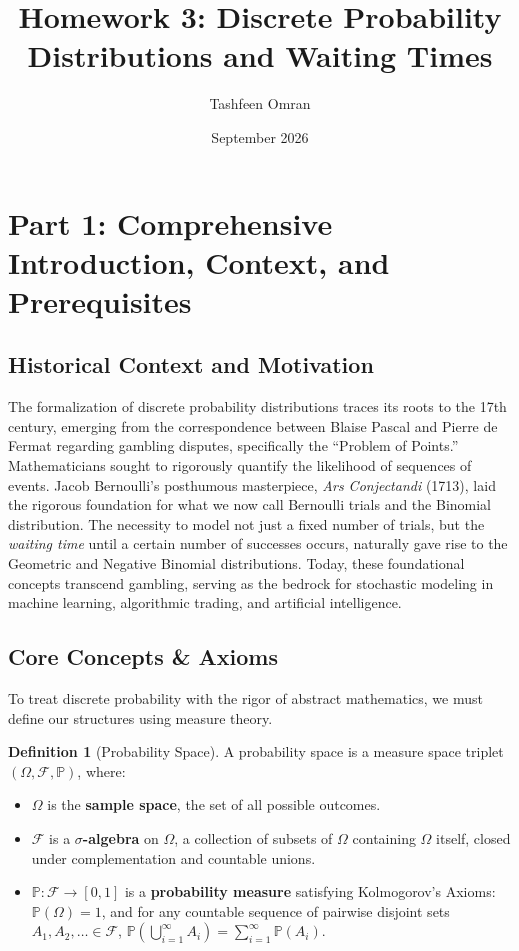 \documentclass[11pt, letterpaper]{article}
\title{\textbf{Homework 3: Discrete Probability Distributions and Waiting Times}}
\author{Tashfeen Omran}
\date{September 2026}
\theoremstyle{definition}
\newtheorem{definition}{Definition}[section]
\theoremstyle{remark}
\newcommand{\Prob}{\mathbb{P}}
\newcommand{\F}{\mathcal{F}}
\begin{document}
\maketitle
\tableofcontents
\newpage

\section{Part 1: Comprehensive Introduction, Context, and Prerequisites}

\subsection{Historical Context and Motivation}
The formalization of discrete probability distributions traces its roots to the 17th century, emerging from the correspondence between Blaise Pascal and Pierre de Fermat regarding gambling disputes, specifically the ``Problem of Points.'' Mathematicians sought to rigorously quantify the likelihood of sequences of events. Jacob Bernoulli's posthumous masterpiece, \textit{Ars Conjectandi} (1713), laid the rigorous foundation for what we now call Bernoulli trials and the Binomial distribution. The necessity to model not just a fixed number of trials, but the \textit{waiting time} until a certain number of successes occurs, naturally gave rise to the Geometric and Negative Binomial distributions. Today, these foundational concepts transcend gambling, serving as the bedrock for stochastic modeling in machine learning, algorithmic trading, and artificial intelligence.

\subsection{Core Concepts \& Axioms}
To treat discrete probability with the rigor of abstract mathematics, we must define our structures using measure theory. 

\begin{definition}[Probability Space]
A probability space is a measure space triplet $(\Omega, \F, \Prob)$, where:
\begin{itemize}
    \item $\Omega$ is the \textbf{sample space}, the set of all possible outcomes.
    \item $\F$ is a \textbf{$\sigma$-algebra} on $\Omega$, a collection of subsets of $\Omega$ containing $\Omega$ itself, closed under complementation and countable unions.
    \item $\Prob: \F \to [0, 1]$ is a \textbf{probability measure} satisfying Kolmogorov's Axioms: $\Prob(\Omega) = 1$, and for any countable sequence of pairwise disjoint sets $A_1, A_2, \dots \in \F$, $\Prob\left(\bigcup_{i=1}^\infty A_i\right) = \sum_{i=1}^\infty \Prob(A_i)$.
\end{itemize}
\end{definition}
\end{document}
